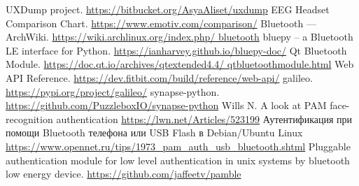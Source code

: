 \documentclass[10pt, a5paper]{article}
\begin{document}
\begin{thebibliography}{11}
 UXDump project. \href{https://bitbucket.org/AsyaAliset/uxdump}{https://bitbucket.org/AsyaAliset/uxdump}
 EEG Headset Comparison Chart. \href{https://www.emotiv.com/comparison}{https://www.emotiv.com/comparison/}
 Bluetooth --- ArchWiki. \href{https://wiki.archlinux.org/index.php/bluetooth}{https://wiki.archlinux.org/index.php/ bluetooth}
 bluepy -- a Bluetooth LE interface for Python. 
\href{https://ianharvey.github.io/bluepy-doc/}{https://ianharvey.github.io/bluepy-doc/}
 Qt Bluetooth Module. \href{https://doc.qt.io/archives/qtextended4.4/qtbluetoothmodule.html}{https://doc.qt.io/archives/qtextended4.4/ qtbluetoothmodule.html}
 Web API Reference. \href{https://dev.fitbit.com/build/reference/web-api/}{https://dev.fitbit.com/build/reference/web-api/}
 galileo. \href{https://pypi.org/project/galileo/}{https://pypi.org/project/galileo/}
 synapse-python. \href{https://github.com/PuzzleboxIO/synapse-python}{https://github.com/PuzzleboxIO/synapse-python}
 Wills N. A look at PAM face-recognition authentication \href{https://lwn.net/Articles/523199}{https://lwn.net/Articles/523199}
 Аутентификация при помощи Bluetooth телефона или USB Flash в Debian/Ubuntu Linux \href{https://www.opennet.ru/tips/1973_pam_auth_usb_bluetooth.shtml}{https://www.opennet.ru/tips/1973\_pam\_auth\_usb\_bluetooth.shtml}
 Pluggable authentication module for low level authentication in unix systems by bluetooth low energy device. \href{https://github.com/jaffeetv/pamble}{https://github.com/jaffeetv/pamble}\end{thebibliography}
\end{document}
